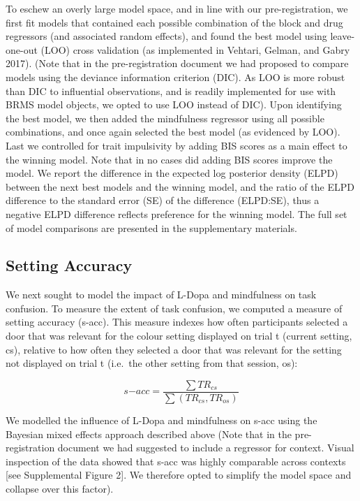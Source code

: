 \documentclass{article}
\begin{document}
To eschew an overly large model space, and in line with our
pre-registration, we first fit models that contained each possible
combination of the block and drug regressors (and associated random
effects), and found the best model using leave-one-out (LOO) cross
validation (as implemented in Vehtari, Gelman, and Gabry 2017). (Note
that in the pre-registration document we had proposed to compare models
using the deviance information criterion (DIC). As LOO is more robust
than DIC to influential observations, and is readily implemented for use
with BRMS model objects, we opted to use LOO instead of DIC). Upon
identifying the best model, we then added the mindfulness regressor
using all possible combinations, and once again selected the best model
(as evidenced by LOO). Last we controlled for trait impulsivity by
adding BIS scores as a main effect to the winning model. Note that in no
cases did adding BIS scores improve the model. We report the difference
in the expected log posterior density (ELPD) between the next best
models and the winning model, and the ratio of the ELPD difference to
the standard error (SE) of the difference (ELPD:SE), thus a negative
ELPD difference reflects preference for the winning model. The full set
of model comparisons are presented in the supplementary materials.

\hypertarget{setting-accuracy}{%
\subsection{Setting Accuracy}\label{setting-accuracy}}

We next sought to model the impact of L-Dopa and mindfulness on task
confusion. To measure the extent of task confusion, we computed a
measure of setting accuracy (s-acc). This measure indexes how often
participants selected a door that was relevant for the colour setting
displayed on trial t (current setting, cs), relative to how often they
selected a door that was relevant for the setting not displayed on trial
t (i.e.~the other setting from that session, os):

\[
s\mathrm{-}acc = \frac{\sum{TR_{cs}}}{\sum{(TR_{cs}, TR_{os})}}
\]

We modelled the influence of L-Dopa and mindfulness on s-acc using the
Bayesian mixed effects approach described above (Note that in the
pre-registration document we had suggested to include a regressor for
context. Visual inspection of the data showed that s-acc was highly
comparable across contexts {[}see Supplemental Figure 2{]}. We therefore
opted to simplify the model space and collapse over this factor).
\end{document}
